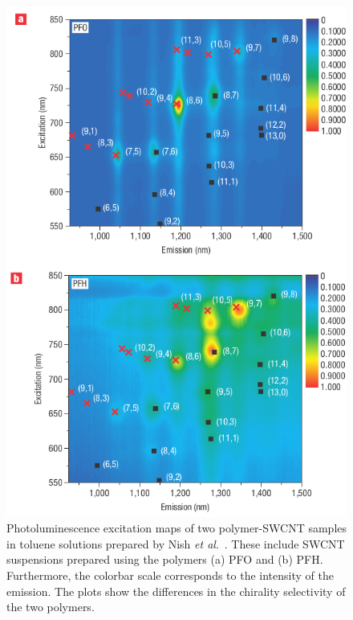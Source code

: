 \begin{figure}[H]
	\centering
	\includegraphics[scale=2.3]{images/chapter_methods/pl_nish_3}
	\caption{Photoluminescence excitation maps of two polymer-SWCNT samples in toluene solutions prepared by Nish \textit{et al}.\ \cite{nish2007highly}. These include SWCNT suspensions prepared using the polymers (a) PFO and (b) PFH. Furthermore, the colorbar scale corresponds to the intensity of the emission. The plots show the differences in the chirality selectivity of the two polymers.
	}
	\label{fig:map_nish}
\end{figure}

